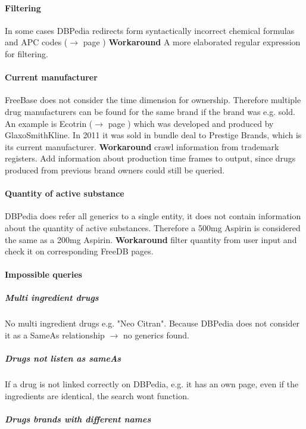 \documentclass[11pt,titlepage,oneside,openany]{book}
\begin{document}
\paragraph{Filtering}
In some cases DBPedia redirects form syntactically incorrect chemical formulas and APC codes ($\rightarrow$ page \pageref{filtering}) \textbf{Workaround} A more elaborated regular expression for filtering.

\paragraph{Current manufacturer}
FreeBase does not consider the time dimension for ownership. Therefore multiple drug manufacturers can be found for the same brand if the brand was e.g. sold. An example is Ecotrin ($\rightarrow$ page \pageref{ex:ecotrin}) which was developed and produced by GlaxoSmithKline. In 2011 it was sold in bundle deal to Prestige Brands, which is its current manufacturer.
\textbf{Workaround} crawl information from trademark registers. Add information about production time frames to output, since drugs produced from previous brand owners could still be queried.

\paragraph{Quantity of active substance}
DBPedia does refer all generics to a single entity, it does not contain information about the quantity of active substances. Therefore a 500mg Aspirin is considered the same as a 200mg Aspirin.
\textbf{Workaround} filter quantity from user input and check it on corresponding FreeDB pages.



\paragraph{Impossible queries}
\label{drug_cocktail}
\subparagraph{Multi ingredient drugs} No multi ingredient drugs e.g. "Neo Citran". Because DBPedia does not consider it as a SameAs relationship $\rightarrow$ no generics found.

\subparagraph{Drugs not listen as sameAs}
\label{drug_sameAs}
If a drug is not linked correctly on DBPedia, e.g. it has an own page, even if the ingredients are identical, the search wont function.

\subparagraph{Drugs brands with different names}
\label{drug_foregin_name}
\end{document}
